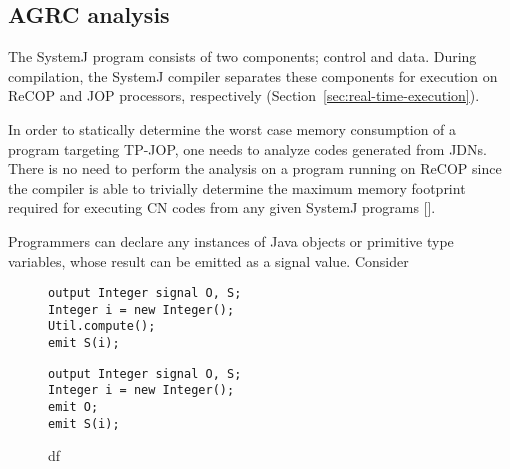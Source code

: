 
\subsection{AGRC analysis}
\label{sec:agrc-analysis}

The SystemJ program consists of two components; control and data. During
compilation, the SystemJ compiler separates these components for
execution on ReCOP and JOP processors, respectively
(Section~\ref{sec:real-time-execution}).

In order to statically determine the worst case memory consumption of a
program targeting TP-JOP, one needs to analyze codes generated from
JDNs. There is no need to perform the analysis on a program running on
ReCOP since the compiler is able to trivially determine the maximum
memory footprint required for executing CN codes from any given SystemJ
programs [].

Programmers can declare any instances of Java objects or primitive type
variables, whose result can be emitted as a signal value. Consider 

\begin{figure}[t!]
	\newsavebox{\hja}
	\begin{lrbox}{\hja}
	\begin{lstlisting}[style=sysj]
output Integer signal O, S;
Integer i = new Integer();
Util.compute();
emit S(i);
	\end{lstlisting}
\end{lrbox}
	\newsavebox{\hjb}
	\begin{lrbox}{\hjb}
	\begin{lstlisting}[style=sysj]
output Integer signal O, S;
Integer i = new Integer();
emit O;
emit S(i);
	\end{lstlisting}
\end{lrbox}
	\centering
	\subfloat[][sss]{\usebox{\hja}}
	\hspace{2cm}
	\subfloat[][ggg]{\usebox{\hjb}}
	\caption{df}
	\label{fig:d}
\end{figure}



